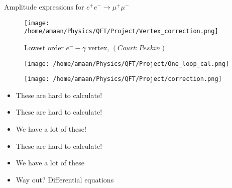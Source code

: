 \documentclass[11pt]{beamer}
\begin{document}
\begin{frame}{Amplitude expressions for $e^+e^-\rightarrow\mu^+\mu^-$}
	\begin{figure}
		\centering
		\texttt{[image: /home/amaan/Physics/QFT/Project/Vertex\_correction.png]}
		\caption{Lowest order $e^--\gamma$ vertex, $(Court:Peskin)$}
	\end{figure}
\end{frame}
\begin{frame}
	\begin{figure}
		\centering
		\texttt{[image: /home/amaan/Physics/QFT/Project/One\_loop\_cal.png]}
	\end{figure}
\begin{figure}
	\centering
	\texttt{[image: /home/amaan/Physics/QFT/Project/correction.png]}
\end{figure}
\end{frame}
\begin{frame}
	\begin{itemize}
		\item These are hard to calculate!
	\end{itemize}
\end{frame}
\begin{frame}
	\begin{itemize}
		\item These are hard to calculate!
		\item We have a lot of these!
	\end{itemize}
\end{frame}
\begin{frame}
	\begin{itemize}
		\item These are hard to calculate!
		\item We have a lot of these
		\item Way out? Differential equations
	\end{itemize}
\end{frame}
\end{document}
